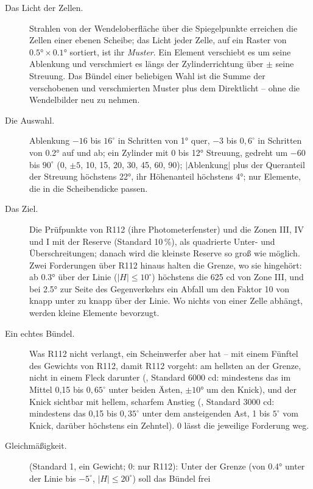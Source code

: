 \begin{description}
  \item[Das Licht der Zellen.] Strahlen von der Wendeloberfläche über die Spiegelpunkte erreichen die
    Zellen einer ebenen Scheibe; das Licht jeder Zelle, auf ein Raster von $\ang{0.5} \times
    \ang{0.1}$ sortiert, ist ihr \emph{Muster}. Ein Element verschiebt es um seine Ablenkung und
    verschmiert es längs der Zylinderrichtung über $\pm$ seine Streuung. Das Bündel einer beliebigen
    Wahl ist die Summe der verschobenen und verschmierten Muster plus dem Direktlicht -- ohne die
    Wendelbilder neu zu nehmen.
  \item[Die Auswahl.] Ablenkung $-16$ bis $16^\circ$ in Schritten von \ang{1} quer, $-3$ bis
    $0{,}6^\circ$ in Schritten von \ang{0.2} auf und ab; ein Zylinder mit 0 bis \ang{12} Streuung,
    gedreht um $-60$ bis $90^\circ$ (0, $\pm 5$, 10, 15, 20, 30, 45, 60, 90); $|$Ablenkung$|$ plus
    der Queranteil der Streuung höchstens \ang{22}, ihr Höhenanteil höchstens \ang{4}; nur Elemente,
    die in die Scheibendicke passen.
  \item[Das Ziel.] Die Prüfpunkte von R112 (ihre Photometerfenster) und die Zonen III, IV und I mit
    der Reserve  (Standard 10\,\%), als quadrierte Unter- und
    Überschreitungen; danach wird die kleinste Reserve so groß wie möglich. Zwei Forderungen über
    R112 hinaus halten die Grenze, wo sie hingehört: ab \ang{0.3} über der Linie ($|H| \leq 10^\circ$)
    höchstens die 625 cd von Zone III, und bei \ang{2.5} zur Seite des Gegenverkehrs ein Abfall um den
    Faktor 10 von knapp unter zu knapp über der Linie. Wo nichts von einer Zelle abhängt, werden
    kleine Elemente bevorzugt.
  \item[Ein echtes Bündel.] Was R112 nicht verlangt, ein Scheinwerfer aber hat -- mit einem Fünftel
    des Gewichts von R112, damit R112 vorgeht: am hellsten an der Grenze, nicht in einem Fleck darunter
    (, Standard 6000 cd: mindestens das im Mittel 0,15 bis
    $0{,}65^\circ$ unter beiden Ästen, $\pm \ang{10}$ um den Knick), und der Knick sichtbar mit
    hellem, scharfem Anstieg (, Standard 3000 cd: mindestens das 0,15
    bis $0{,}35^\circ$ unter dem ansteigenden Ast, 1 bis $5^\circ$ vom Knick, darüber höchstens ein
    Zehntel). 0 lässt die jeweilige Forderung weg.
  \item[Gleichmäßigkeit.]  (Standard 1, ein Gewicht; 0: nur R112): Unter der
    Grenze (von \ang{0.4} unter der Linie bis $-5^\circ$, $|H| \leq 20^\circ$) soll das Bündel frei

\end{description}
